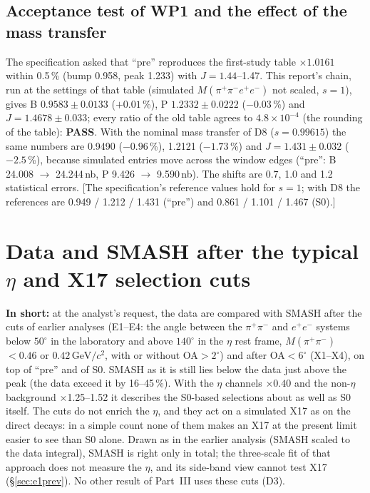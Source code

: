 \documentclass[11pt,a4paper]{article}
\newcommand{\ee}{\ensuremath{e^{+}e^{-}}\xspace}
\newcommand{\pipi}{\ensuremath{\pi^{+}\pi^{-}}\xspace}
\newcommand{\Mfour}{\ensuremath{M(\pi^{+}\pi^{-}e^{+}e^{-})}\xspace}
\newcommand{\Mpipi}{\ensuremath{M(\pi^{+}\pi^{-})}\xspace}
\newcommand{\GeVcc}{\ensuremath{\mathrm{GeV}/c^{2}}\xspace}
\newcommand{\code}[1]{\texttt{\detokenize{#1}}}
\newcommand{\tipbox}[1]{\par\noindent\colorbox{blue!6}{\parbox{\dimexpr\linewidth-2\fboxsep\relax}{#1}}\par}
\newcommand{\flag}[1]{\textcolor{red!60!black}{[#1]}}
\newcommand{\inshort}[1]{\tipbox{\textbf{In short:} #1}}%
\newcommand{\cs}[1]{\textsf{#1}}%
\begin{document}
\subsection{Acceptance test of WP1 and the effect of the mass transfer}
\label{sec:wp1acc}
The specification asked that ``pre'' reproduces the first-study table \code{rw_compare_enriched.txt} $\times1.0161$ within 0.5\,\%
(bump 0.958, peak 1.233) with $J=1.44$--1.47. This report's chain, run at the settings of that table (simulated \Mfour not scaled,
$s=1$), gives B $0.9583\pm0.0133$ ($+0.01$\,\%), P $1.2332\pm0.0222$ ($-0.03$\,\%) and $J=1.4678\pm0.033$; every ratio of the old
table agrees to $4.8\times10^{-4}$ (the rounding of the table): \textbf{PASS}. With the nominal mass transfer of D8 ($s=0.99615$)
the same numbers are 0.9490 ($-0.96$\,\%), 1.2121 ($-1.73$\,\%) and $J=1.431\pm0.032$ ($-2.5$\,\%), because simulated entries move
across the window edges (``pre'': B 24.008 $\to$ 24.244\,nb, P 9.426 $\to$ 9.590\,nb). The shifts are 0.7, 1.0 and 1.2 statistical
errors. \flag{The specification's reference values hold for $s=1$; with D8 the references are 0.949 / 1.212 / 1.431 (``pre'') and
0.861 / 1.101 / 1.467 (S0).}

\section{Data and SMASH after the typical \texorpdfstring{$\eta$}{eta} and X17 selection cuts}
\label{sec:e1}
\inshort{at the analyst's request, the data are compared with SMASH after the cuts of earlier analyses (\cs{E1}--\cs{E4}: the angle between
the \pipi and \ee systems below $50^\circ$ in the laboratory and above $140^\circ$ in the $\eta$ rest frame, \Mpipi$<0.46$ or $0.42$\,\GeVcc,
with or without OA$>2^\circ$) and after OA$<6^\circ$ (\cs{X1}--\cs{X4}), on top of ``pre'' and of S0. SMASH as it is still lies below the data
just above the peak (the data exceed it by 16--45\,\%). With the $\eta$ channels $\times0.40$ and the non-$\eta$ background $\times$1.25--1.52
it describes the S0-based selections about as well as S0 itself. The cuts do not enrich the $\eta$, and they act on a simulated X17 as on the direct
decays: in a simple count none of them makes an X17 at the present limit easier to see than S0 alone. Drawn as in the earlier analysis (SMASH
scaled to the data integral), SMASH is right only in total; the three-scale fit of that approach does not measure the $\eta$, and its side-band
view cannot test X17 (\S\ref{sec:e1prev}). No other result of Part~III uses these cuts (D3).}
\end{document}
